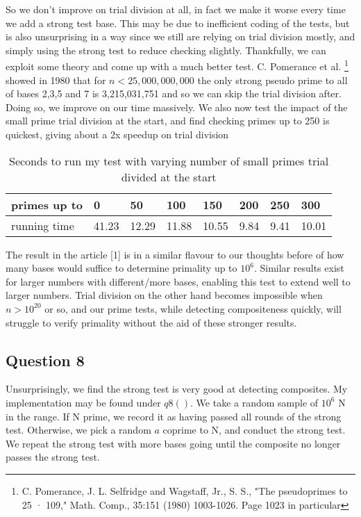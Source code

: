 \documentclass[10pt,a4paper]{report}
\begin{document}
So we don't improve on trial division at all, in fact we make it worse every time we add a strong test base. This may be due to inefficient coding of the tests, but is also unsurprising in a way since we still are relying on trial division mostly, and simply using the strong test to reduce checking slightly. Thankfully, we can exploit some theory and come up with a much better test. C. Pomerance et al. \footnote{C. Pomerance, J. L. Selfridge and Wagstaff, Jr., S. S., "The pseudoprimes to 25 · 109," Math. Comp., 35:151 (1980) 1003-1026. Page 1023 in particular} showed  in 1980 that for $n < 25,000,000,000$ the only strong pseudo prime to all of bases 2,3,5 and 7 is  3,215,031,751 and so we can skip the trial division after. Doing so, we improve on our time massively. We also now test the impact of the small prime trial division at the start, and find checking primes up to 250 is quickest, giving about a 2x speedup on trial division\\

\begin{table}[h]
\centering
\begin{tabular}{|l|l|l|l|l|l|l|l|}
\hline
primes up to & 0     & 50    & 100   & 150   & 200  & 250  & 300   \\ \hline
running time & 41.23 & 12.29 & 11.88 & 10.55 & 9.84 & 9.41 & 10.01 \\ \hline
\end{tabular}
\caption{Seconds to run my test with varying number of small primes trial divided at the start}
\end{table}

The result in the article [1] is in a similar flavour to our thoughts before of how many bases would suffice to determine primality up to $10^6$. Similar results exist for larger numbers with different/more bases, enabling this test to extend well to larger numbers. Trial division on the other hand becomes impossible when $n>10^{20}$ or so, and our prime tests, while detecting compositeness quickly, will struggle to verify primality without the aid of these stronger results.\\




\subsection*{Question 8}
Unsurprisingly, we find the strong test is very good at detecting composites. My implementation may be found under $q8()$. We take a random sample of $10^6$ N in the range. If N prime, we record it as having passed all rounds of the strong test. Otherwise, we pick a random $a$ coprime to N, and conduct the strong test. We repeat the strong test with more bases going until the composite no longer passes the strong test.\\
\end{document}
